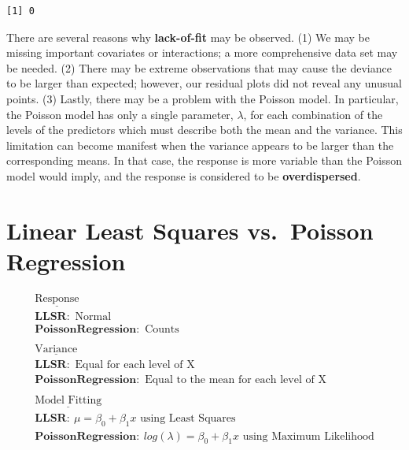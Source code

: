 \documentclass[
]{krantz}
\begin{document}
\begin{verbatim}
[1] 0
\end{verbatim}

There are several reasons why \textbf{lack-of-fit}  may be observed. (1) We may be missing important covariates or interactions; a more comprehensive data set may be needed. (2) There may be extreme observations that may cause the deviance to be larger than expected; however, our residual plots did not reveal any unusual points. (3) Lastly, there may be a problem with the Poisson model. In particular, the Poisson model has only a single parameter, \(\lambda\), for each combination of the levels of the predictors which must describe both the mean and the variance. This limitation can become manifest when the variance appears to be larger than the corresponding means. In that case, the response is more variable than the Poisson model would imply, and the response is considered to be \textbf{overdispersed}. 

\hypertarget{linear-least-squares-vs.-poisson-regression}{%
\section{\texorpdfstring{Linear Least Squares  vs.~Poisson Regression }{Linear Least Squares  vs.~Poisson Regression }}\label{linear-least-squares-vs.-poisson-regression}}

\begin{gather*}
\underline{\textrm{Response}} \\
\mathbf{LLSR:}\textrm{ Normal} \\
\mathbf{Poisson Regression:}\textrm{ Counts} \\
\textrm{ } \\
\underline{\textrm{Variance}} \\
\mathbf{LLSR:}\textrm{ Equal for each level of X} \\
\mathbf{Poisson Regression:}\textrm{ Equal to the mean for each level of X} \\
\textrm{ } \\
\underline{\textrm{Model Fitting}} \\
\mathbf{LLSR:}\ \mu=\beta_0+\beta_1x \textrm{ using Least Squares}\\
\mathbf{Poisson Regression:}\ log(\lambda)=\beta_0+\beta_1x \textrm{ using Maximum Likelihood}\\
\end{gather*}
\end{document}
